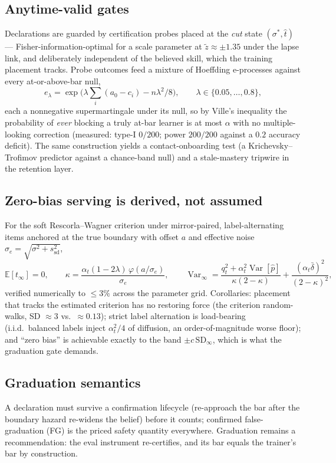 \documentclass[11pt]{article}
\DeclareMathOperator{\Var}{Var}
\begin{document}
\subsection{Anytime-valid gates}
Declarations are guarded by certification probes placed at the \emph{cut} state
$(\sigma^{*}, \hat t)$ --- Fisher-information-optimal for a scale parameter at
$\tilde z \approx \pm 1.35$ under the lapse link, and deliberately independent of
the believed skill, which the training placement tracks. Probe outcomes feed a
mixture of Hoeffding e-processes against every at-or-above-bar null,
\begin{equation}
e_\lambda = \exp\!\Big(\lambda \textstyle\sum_i (a_0 - c_i) - n\lambda^2/8\Big),
\qquad \lambda \in \{0.05, \dots, 0.8\},
\end{equation}
each a nonnegative supermartingale under its null, so by Ville's inequality the
probability of \emph{ever} blocking a truly at-bar learner is at most $\alpha$
with no multiple-looking correction (measured: type-I $0/200$; power $200/200$
against a $0.2$ accuracy deficit). The same construction yields a
contact-onboarding test (a Krichevsky--Trofimov predictor against a chance-band
null) and a stale-mastery tripwire in the retention layer.

\subsection{Zero-bias serving is derived, not assumed}
For the soft Rescorla--Wagner criterion under mirror-paired, label-alternating
items anchored at the true boundary with offset $a$ and effective noise
$\sigma_e = \sqrt{\sigma^2 + s_{\mathrm{sd}}^2}$,
\begin{equation}
\mathbb{E}[t_\infty] = 0, \qquad
\kappa = \frac{\alpha_t (1-2\lambda)\,\varphi(a/\sigma_e)}{\sigma_e}, \qquad
\Var_\infty = \frac{q_t^2 + \alpha_t^2 \Var[\hat p]}{\kappa(2-\kappa)}
+ \frac{(\alpha_t \bar\delta)^2}{(2-\kappa)^2},
\end{equation}
verified numerically to $\le 3\%$ across the parameter grid. Corollaries:
placement that tracks the estimated criterion has no restoring force (the
criterion random-walks, SD ${\approx}3$ vs.\ ${\approx}0.13$); strict label
alternation is load-bearing (i.i.d.\ balanced labels inject $\alpha_t^2/4$ of
diffusion, an order-of-magnitude worse floor); and ``zero bias'' is achievable
exactly to the band $\pm c\,\mathrm{SD}_\infty$, which is what the graduation
gate demands.

\subsection{Graduation semantics}
A declaration must survive a confirmation lifecycle (re-approach the bar after
the boundary hazard re-widens the belief) before it counts; confirmed
false-graduation (FG) is the priced safety quantity everywhere. Graduation
remains a recommendation: the eval instrument re-certifies, and its bar equals
the trainer's bar by construction.
\end{document}
